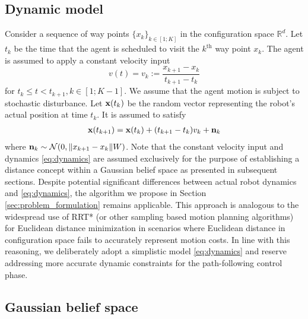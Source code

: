 \documentclass[Afour,sageh,times]{sagej}
\newcommand{\bx}{{\bf x}}
\newcommand{\bn}{{\bf n}}
\begin{document}
\subsection{Dynamic model}

Consider a sequence of way points $\{x_k\}_{k\in[1;K]}$ in the configuration space $\mathbb{R}^d$.
Let $t_k$ be the time that the agent is scheduled to visit the $k^\text{th}$ way point $x_k$.
The agent is assumed to apply a constant velocity input
\[
v(t) = v_k := \frac{x_{k+1}-x_k}{t_{k+1}-t_k}
\]
for $t_k \leq t < t_{k+1}, k\in[1;K-1]$.
We assume that the agent motion is subject to stochastic disturbance.
Let $\bx(t_k)$ be the random vector representing the robot's actual position at time $t_k$. It is assumed to satisfy
\begin{align}
 \label{eq:dynamics}
\bx(t_{k+1})=\bx(t_k)+(t_{k+1}-t_k)v_k+\bn_k
\end{align}
where $\bn_k \sim\mathcal{N}(0, \|x_{k+1}-x_k\|W)$.
Note that the constant velocity input and dynamics \eqref{eq:dynamics} are assumed exclusively for the purpose of establishing a distance concept within a Gaussian belief space as presented in subsequent sections. Despite potential significant differences between actual robot dynamics and \eqref{eq:dynamics}, the algorithm we propose in Section \ref{sec:problem_formulation} remains applicable. This approach is analogous to the widespread use of RRT* (or other sampling based motion planning algorithms) for Euclidean distance minimization in scenarios where Euclidean distance in configuration space fails to accurately represent motion costs. In line with this reasoning, we deliberately adopt a simplistic model \eqref{eq:dynamics} and reserve addressing more accurate dynamic constraints for the path-following control phase.
\subsection{Gaussian belief space}
\end{document}
